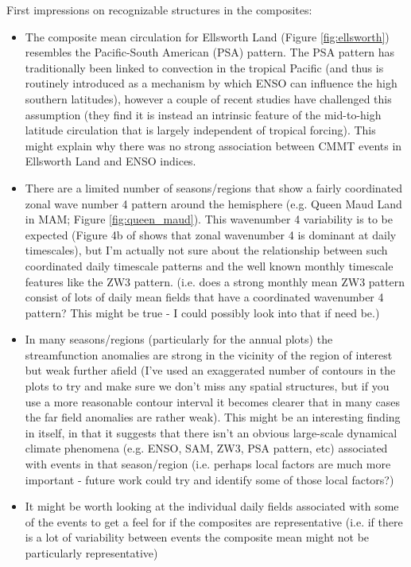 First impressions on recognizable structures in the composites: 
\begin{itemize}
\item The composite mean circulation for Ellsworth Land (Figure \ref{fig:ellsworth}) resembles the Pacific-South American (PSA) pattern. The PSA pattern has traditionally been linked to convection in the tropical Pacific (and thus is routinely introduced as a mechanism by which ENSO can influence the high southern latitudes), however a couple of recent studies \citep{Irving2016,OKane2017} have challenged this assumption (they find it is instead an intrinsic feature of the mid-to-high latitude circulation that is largely independent of tropical forcing). This might explain why there was no strong association between CMMT events in Ellsworth Land and ENSO indices.
\item There are a limited number of seasons/regions that show a fairly coordinated zonal wave number 4 pattern around the hemisphere (e.g. Queen Maud Land in MAM; Figure \ref{fig:queen_maud}). This wavenumber 4 variability is to be expected (Figure 4b of \citet{Irving2015} shows that zonal wavenumber 4 is dominant at daily timescales), but I'm actually not sure about the relationship between such coordinated daily timescale patterns and the well known monthly timescale features like the ZW3 pattern. (i.e. does a strong monthly mean ZW3 pattern consist of lots of daily mean fields that have a coordinated wavenumber 4 pattern? This might be true - I could possibly look into that if need be.)
\item In many seasons/regions (particularly for the annual plots) the streamfunction anomalies are strong in the vicinity of the region of interest but weak further afield (I've used an exaggerated number of contours in the plots to try and make sure we don't miss any spatial structures, but if you use a more reasonable contour interval it becomes clearer that in many cases the far field anomalies are rather weak). This might be an interesting finding in itself, in that it suggests that there isn't an obvious large-scale dynamical climate phenomena (e.g. ENSO, SAM, ZW3, PSA pattern, etc) associated with events in that season/region (i.e. perhaps local factors are much more important - future work could try and identify some of those local factors?)  
\item It might be worth looking at the individual daily fields associated with some of the events to get a feel for if the composites are representative (i.e. if there is a lot of variability between events the composite mean might not be particularly representative)
\end{itemize}
